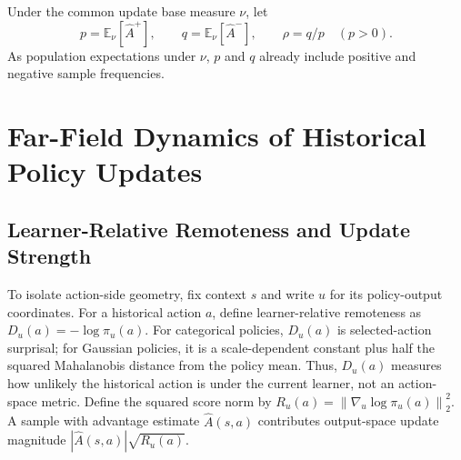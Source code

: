 \documentclass{article}
\theoremstyle{plain}
\theoremstyle{definition}
\theoremstyle{remark}
\begin{document}
Under the common update base measure \(\nu\), let
\begin{equation}
    p=\mathbb E_\nu[\widehat A^+],
    \qquad
    q=\mathbb E_\nu[\widehat A^-],
    \qquad
    \rho=q/p \quad (p>0).
    \label{eq:aggregate_masses}
\end{equation}
As population expectations under \(\nu\), \(p\) and \(q\) already include
positive and negative sample frequencies.

\section{Far-Field Dynamics of Historical Policy Updates}
\label{sec:theory}



\subsection{Learner-Relative Remoteness and Update Strength}
\label{sec:distance_strength}

To isolate action-side geometry, fix context $s$ and write $u$ for its
policy-output coordinates. For a historical action $a$, define learner-relative remoteness as
\(
    D_u(a)
    =
    -\log \pi_u(a).
\)
For categorical policies, $D_u(a)$ is selected-action surprisal; for Gaussian
policies, it is a scale-dependent constant plus half the squared Mahalanobis
distance from the policy mean. Thus, $D_u(a)$ measures how unlikely the
historical action is under the current learner, not an action-space metric.
Define the squared score norm by
\(
    R_u(a)
    =
    \left\|
        \nabla_u \log \pi_u(a)
    \right\|_2^2.
\)
A sample with advantage estimate $\widehat{A}(s,a)$ contributes output-space
update magnitude $|\widehat{A}(s,a)|\sqrt{R_u(a)}$.
\end{document}
